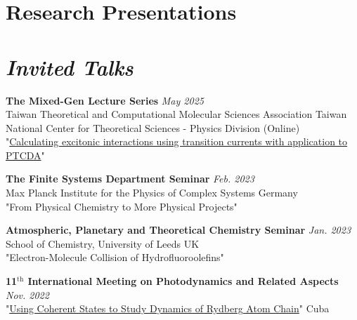 \section{\sc Research Presentations}





\vspace{25pt}

\section{\sl Invited Talks}

{\bf The Mixed-Gen Lecture Series} \hfill \textit{May 2025} \\
Taiwan Theoretical and Computational Molecular Sciences Association \hfill Taiwan\\
National Center for Theoretical Sciences - Physics Division \hfill (Online) \\
"\href{https://www.t2comsa.tw/newmixed-gen-lecture-series-20250508/}{Calculating excitonic interactions using transition currents with application to PTCDA}" 


{\bf The Finite Systems Department Seminar}  \hfill \textit{Feb. 2023}\\ 
Max Planck Institute for the Physics of Complex Systems \hfill Germany \\
"From Physical Chemistry to More Physical Projects"
   
{\bf Atmospheric, Planetary and Theoretical Chemistry Seminar} \hfill \textit{Jan. 2023} \\
School of Chemistry, University of Leeds \hfill UK \\
"Electron-Molecule Collision of Hydrofluoroolefins"

{\bf 11$^{\text{th}}$ International Meeting on Photodynamics and Related Aspects} \hfill \textit{Nov. 2022}\\
"\href{https://photodynamics.instec.cu/pages/speakersconfirm.php}{Using Coherent States to Study Dynamics of Rydberg Atom Chain}" \hfill Cuba

